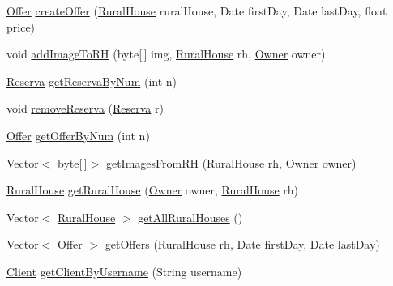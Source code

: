 \begin{DoxyCompactItemize}
\mbox{\hyperlink{classdomain_1_1_offer}{Offer}} \mbox{\hyperlink{classdata_access_1_1_data_access_ac07343daf9aa06679c7b28c082950ab0}{create\+Offer}} (\mbox{\hyperlink{classdomain_1_1_rural_house}{Rural\+House}} rural\+House, Date first\+Day, Date last\+Day, float price)
\item 
void \mbox{\hyperlink{classdata_access_1_1_data_access_ac3b7d95db57811e7a7e41c74d1d8a807}{add\+Image\+To\+RH}} (byte\mbox{[}$\,$\mbox{]} img, \mbox{\hyperlink{classdomain_1_1_rural_house}{Rural\+House}} rh, \mbox{\hyperlink{classdomain_1_1_owner}{Owner}} owner)
\item 
\mbox{\hyperlink{classdomain_1_1_reserva}{Reserva}} \mbox{\hyperlink{classdata_access_1_1_data_access_ad2661c3e2d7e0550b837b2763456683d}{get\+Reserva\+By\+Num}} (int n)
\item 
void \mbox{\hyperlink{classdata_access_1_1_data_access_a2980497a576b4e113f96daf113620b7e}{remove\+Reserva}} (\mbox{\hyperlink{classdomain_1_1_reserva}{Reserva}} r)
\item 
\mbox{\hyperlink{classdomain_1_1_offer}{Offer}} \mbox{\hyperlink{classdata_access_1_1_data_access_a542a2ce3e970075b63c22b8cefac42ee}{get\+Offer\+By\+Num}} (int n)
\item 
Vector$<$ byte\mbox{[}$\,$\mbox{]}$>$ \mbox{\hyperlink{classdata_access_1_1_data_access_a11f6dae8ff930c2552445dbf4d292268}{get\+Images\+From\+RH}} (\mbox{\hyperlink{classdomain_1_1_rural_house}{Rural\+House}} rh, \mbox{\hyperlink{classdomain_1_1_owner}{Owner}} owner)
\item 
\mbox{\hyperlink{classdomain_1_1_rural_house}{Rural\+House}} \mbox{\hyperlink{classdata_access_1_1_data_access_a8addeaaedd74ad2fb8e285672c22d216}{get\+Rural\+House}} (\mbox{\hyperlink{classdomain_1_1_owner}{Owner}} owner, \mbox{\hyperlink{classdomain_1_1_rural_house}{Rural\+House}} rh)
\item 
Vector$<$ \mbox{\hyperlink{classdomain_1_1_rural_house}{Rural\+House}} $>$ \mbox{\hyperlink{classdata_access_1_1_data_access_a13b08775ff3b4b3859a7772de6592fb0}{get\+All\+Rural\+Houses}} ()
\item 
Vector$<$ \mbox{\hyperlink{classdomain_1_1_offer}{Offer}} $>$ \mbox{\hyperlink{classdata_access_1_1_data_access_ab8f58c04c48032a83b000d6de7f47d4e}{get\+Offers}} (\mbox{\hyperlink{classdomain_1_1_rural_house}{Rural\+House}} rh, Date first\+Day, Date last\+Day)
\item 
\mbox{\hyperlink{classdomain_1_1_client}{Client}} \mbox{\hyperlink{classdata_access_1_1_data_access_af7f43a6feb37bdb96c5d80a9e6344f8f}{get\+Client\+By\+Username}} (String username)

\end{DoxyCompactItemize}
